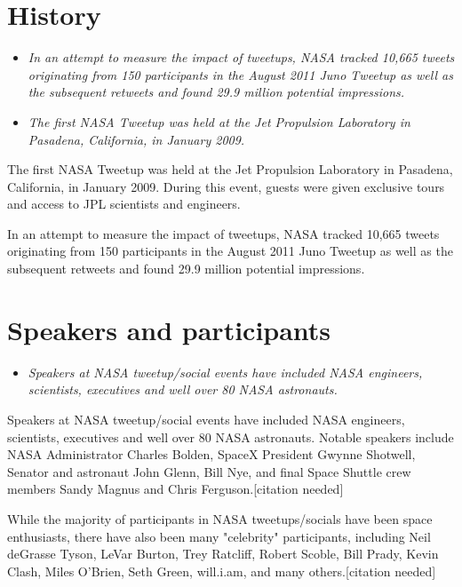 \section{History}\label{history}

\begin{itemize}
\item
  \emph{In an attempt to measure the impact of tweetups, NASA tracked
  10,665 tweets originating from 150 participants in the August 2011
  Juno Tweetup as well as the subsequent retweets and found 29.9 million
  potential impressions.}
\item
  \emph{The first NASA Tweetup was held at the Jet Propulsion Laboratory
  in Pasadena, California, in January 2009.}
\end{itemize}

The first NASA Tweetup was held at the Jet Propulsion Laboratory in
Pasadena, California, in January 2009. During this event, guests were
given exclusive tours and access to JPL scientists and
engineers.\textbar{}

In an attempt to measure the impact of tweetups, NASA tracked 10,665
tweets originating from 150 participants in the August 2011 Juno Tweetup
as well as the subsequent retweets and found 29.9 million potential
impressions.

\section{Speakers and participants}\label{speakers-and-participants}

\begin{itemize}
\item
  \emph{Speakers at NASA tweetup/social events have included NASA
  engineers, scientists, executives and well over 80 NASA astronauts.}
\end{itemize}

Speakers at NASA tweetup/social events have included NASA engineers,
scientists, executives and well over 80 NASA astronauts. Notable
speakers include NASA Administrator Charles Bolden, SpaceX President
Gwynne Shotwell, Senator and astronaut John Glenn, Bill Nye, and final
Space Shuttle crew members Sandy Magnus and Chris Ferguson.{[}citation
needed{]}

While the majority of participants in NASA tweetups/socials have been
space enthusiasts, there have also been many "celebrity" participants,
including Neil deGrasse Tyson, LeVar Burton, Trey Ratcliff, Robert
Scoble, Bill Prady, Kevin Clash, Miles O'Brien, Seth Green, will.i.am,
and many others.{[}citation needed{]}

